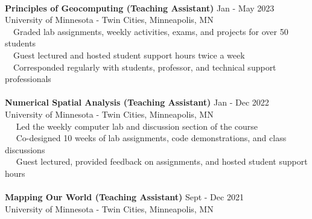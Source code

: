 \documentclass[letterpaper,12pt]{article}
\numberwithin{equation}{section}
\begin{document}
\\
 \hspace*{1.16in}\textbf{Principles of Geocomputing (Teaching Assistant)} \hspace*{1.2in} Jan - May 2023 \\ \hspace*{1.16in} University of Minnesota - Twin Cities, Minneapolis, MN \\ 
 \hspace*{1.2in} \textbullet ~~Graded lab assignments, weekly activities, exams, and projects for over 50 students  \\
 \hspace*{1.2in} \textbullet ~~Guest lectured and hosted student support hours twice a week\\
 \hspace*{1.2in} \textbullet ~~Corresponded regularly with students, professor, and technical support professionals\\
 \\
 \hspace*{1.16in} \textbf{Numerical Spatial Analysis (Teaching Assistant)} \hspace*{1.2in} Jan - Dec 2022\\
 \hspace*{1.16in} University of Minnesota - Twin Cities, Minneapolis, MN \vspace*{.1cm}\\
 \hspace*{1.2in} \textbullet ~~ Led the weekly computer lab and discussion section of the course\\
 \hspace*{1.2in} \textbullet ~~ Co-designed 10 weeks of lab assignments, code demonstrations, and class discussions\\
 \hspace*{1.2in} \textbullet ~~ Guest lectured, provided feedback on assignments, and hosted student support hours
\\\\
 \hspace*{1.16in} \textbf{Mapping Our World (Teaching Assistant)} \hspace*{1.7in} Sept - Dec 2021\\
 \hspace*{1.16in} University of Minnesota - Twin Cities, Minneapolis, MN \vspace*{.1cm}\\
\end{document}
